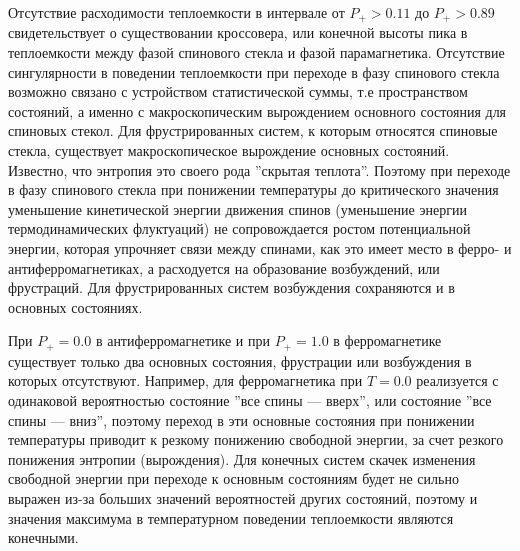 Отсутствие расходимости теплоемкости в интервале от $P_+>0.11$ до $P_+>0.89$ свидетельствует о существовании кроссовера, или конечной высоты пика в теплоемкости между фазой спинового стекла и фазой парамагнетика. Отсутствие сингулярности в поведении теплоемкости при переходе в фазу спинового стекла возможно связано с устройством статистической суммы, т.е пространством состояний, а именно с макроскопическим вырождением основного состояния для спиновых стекол. Для фрустрированных систем, к которым относятся спиновые стекла, существует макроскопическое вырождение основных состояний. Известно, что энтропия это своего рода ''скрытая теплота''. Поэтому при переходе в фазу спинового стекла при понижении температуры до критического значения уменьшение кинетической энергии движения спинов (уменьшение энергии термодинамических флуктуаций) не сопровождается ростом потенциальной энергии, которая упрочняет связи между спинами, как это имеет место в ферро- и антиферромагнетиках, а расходуется на образование возбуждений, или фрустраций. Для фрустрированных систем возбуждения сохраняются и в основных состояниях. 


При $P_+=0.0$ в антиферромагнетике и при $P_+=1.0$ в ферромагнетике существует только два основных состояния, фрустрации или возбуждения в которых отсутствуют. Например, для ферромагнетика при $T=0.0$ реализуется с одинаковой вероятностью состояние ''все спины --- вверх'', или состояние ''все спины --- вниз'', поэтому переход в эти основные состояния при понижении температуры приводит к резкому понижению свободной энергии, за счет резкого понижения энтропии (вырождения). Для конечных систем скачек изменения свободной энергии при переходе к основным состояниям будет не сильно выражен из-за больших значений вероятностей других состояний, поэтому и значения максимума в температурном поведении теплоемкости являются конечными. 



